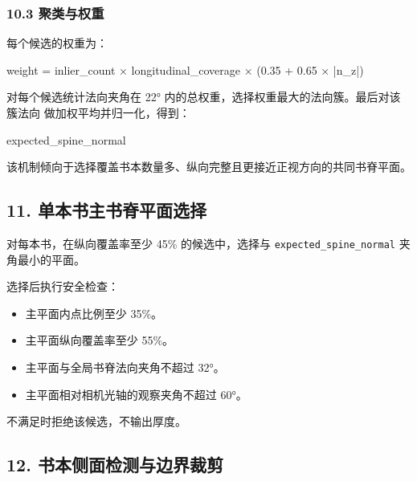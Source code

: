 \documentclass[
  chinese,
  11pt,
  a4paper,
]{article}
\newenvironment{Shaded}{\begin{snugshade}}{\end{snugshade}}
\newcommand{\NormalTok}[1]{#1}
\providecommand{\tightlist}{%
  \setlength{\itemsep}{0pt}\setlength{\parskip}{0pt}}
\begin{document}
\subsubsection{10.3
聚类与权重}\label{103-ux805aux7c7bux4e0eux6743ux91cd}

每个候选的权重为：

\begin{Shaded}
\begin{Highlighting}[]
\NormalTok{weight =}
\NormalTok{  inlier\_count}
\NormalTok{  × longitudinal\_coverage}
\NormalTok{  × (0.35 + 0.65 × |n\_z|)}
\end{Highlighting}
\end{Shaded}

对每个候选统计法向夹角在 22°
内的总权重，选择权重最大的法向簇。最后对该簇法向
做加权平均并归一化，得到：

\begin{Shaded}
\begin{Highlighting}[]
\NormalTok{expected\_spine\_normal}
\end{Highlighting}
\end{Shaded}

该机制倾向于选择覆盖书本数量多、纵向完整且更接近正视方向的共同书脊平面。

\subsection{11.
单本书主书脊平面选择}\label{11-ux5355ux672cux4e66ux4e3bux4e66ux810aux5e73ux9762ux9009ux62e9}

对每本书，在纵向覆盖率至少 45\% 的候选中，选择与
\texttt{expected\_spine\_normal} 夹角最小的平面。

选择后执行安全检查：

\begin{itemize}
\tightlist
\item
  主平面内点比例至少 35\%。
\item
  主平面纵向覆盖率至少 55\%。
\item
  主平面与全局书脊法向夹角不超过 32°。
\item
  主平面相对相机光轴的观察夹角不超过 60°。
\end{itemize}

不满足时拒绝该候选，不输出厚度。

\subsection{12.
书本侧面检测与边界裁剪}\label{12-ux4e66ux672cux4fa7ux9762ux68c0ux6d4bux4e0eux8fb9ux754cux88c1ux526a}
\end{document}

